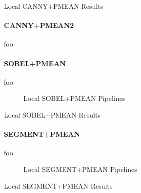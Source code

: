 \begin{table}[h]
    \centering
    
    \caption[Local CANNY+PMEAN Results]{
        Local CANNY+PMEAN Results
    }
    \label{tab:results_local_luma_canny_pmean}
\end{table}

\paragraph{CANNY+PMEAN2}

foo

\paragraph{SOBEL+PMEAN}

foo

\begin{figure}[h]
    \centering
    
    \caption[Local SOBEL+PMEAN Pipelines]{
        Local SOBEL+PMEAN Pipelines
    }
    \label{fig:pipeline_local_luma_sobel_pmean}
\end{figure}

\begin{table}[h]
    \centering
    
    \caption[Local SOBEL+PMEAN Results]{
        Local SOBEL+PMEAN Results
    }
    \label{tab:results_local_luma_sobel_pmean}
\end{table}

\paragraph{SEGMENT+PMEAN}

foo

\begin{figure}[h]
    \centering
    
    \caption[Local SEGMENT+PMEAN Pipelines]{
        Local SEGMENT+PMEAN Pipelines
    }
    \label{fig:pipeline_local_luma_segment_pmean}
\end{figure}

\begin{table}[h]
    \centering
    
    \caption[Local SEGMENT+PMEAN Results]{
        Local SEGMENT+PMEAN Results
    }
    \label{tab:results_local_luma_segment_pmean}
\end{table}
